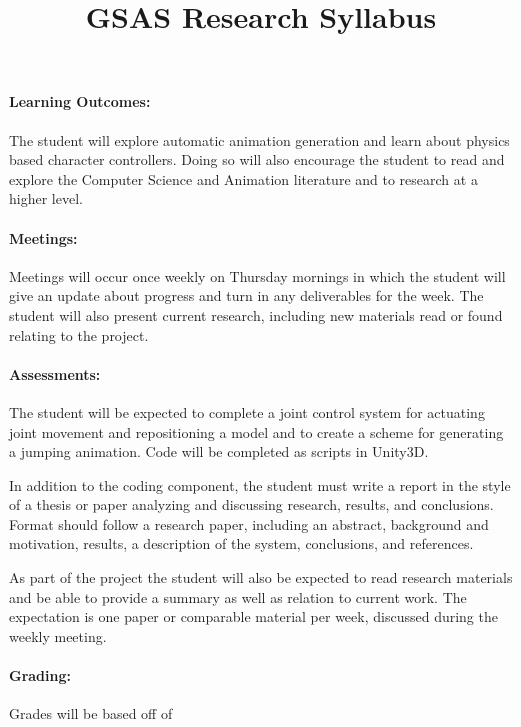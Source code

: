 \documentclass[12pt, letter]{article}
\title{GSAS Research Syllabus}
\date{}
\begin{document}
	\maketitle
	\paragraph{Learning Outcomes:} The student will explore automatic animation generation and learn about physics based character controllers.  Doing so will also encourage the student to read and explore the Computer Science and Animation literature and to research at a higher level.
	
	\paragraph{Meetings:} Meetings will occur once weekly on Thursday mornings in which the student will give an update about progress and turn in any deliverables for the week.  The student will also present current research, including new materials read or found relating to the project.
	
	\paragraph{Assessments:} The student will be expected to complete a joint control system for actuating joint movement and repositioning a model and to create a scheme for generating a jumping animation.  Code will be completed as scripts in Unity3D.
	
	In addition to the coding component, the student must write a report in the style of a thesis or paper analyzing and discussing research, results, and conclusions.  Format should follow a research paper, including an abstract, background and motivation, results, a description of the system, conclusions, and references.
	
	As part of the project the student will also be expected to read research materials and be able to provide a summary as well as relation to current work.  The expectation is one paper or comparable material per week, discussed during the weekly meeting.
	
	\paragraph{Grading:} Grades will be based off of 
\end{document}

